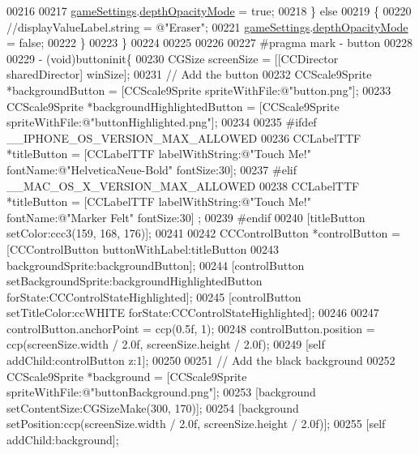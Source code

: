 \begin{DoxyCode}
{{00216         
00217         \hyperlink{interface_controls_layer_a6fb04c60ed1bfab11e2940a025b4927e}{gameSettings}.\hyperlink{interface_game_settings_a1ac5ddcb61e46f952ccd0e876a8578a4}{depthOpacityMode}  = \textcolor{keyword}{true};
00218     \} \textcolor{keywordflow}{else}
00219     \{
00220         \textcolor{comment}{//displayValueLabel.string    = @"Eraser";}
00221         \hyperlink{interface_controls_layer_a6fb04c60ed1bfab11e2940a025b4927e}{gameSettings}.\hyperlink{interface_game_settings_a1ac5ddcb61e46f952ccd0e876a8578a4}{depthOpacityMode}  = \textcolor{keyword}{false};
00222     \}
00223 \}
00224 
00225 
00226 
00227 \textcolor{preprocessor}{#pragma mark - button}
00228 \textcolor{preprocessor}{}
00229 - (void)buttoninit\{
00230     CGSize screenSize = [[CCDirector sharedDirector] winSize];
00231     \textcolor{comment}{// Add the button}
00232     CCScale9Sprite *backgroundButton = [CCScale9Sprite spriteWithFile:@"button.png"];
00233     CCScale9Sprite *backgroundHighlightedButton = [CCScale9Sprite spriteWithFile:@"buttonHighlighted.png"];
00234     
00235 \textcolor{preprocessor}{#ifdef \_\_IPHONE\_OS\_VERSION\_MAX\_ALLOWED}
00236 \textcolor{preprocessor}{}    CCLabelTTF *titleButton = [CCLabelTTF labelWithString:@"Touch Me!" fontName:@"HelveticaNeue-Bold" 
      fontSize:30];
00237 \textcolor{preprocessor}{#elif \_\_MAC\_OS\_X\_VERSION\_MAX\_ALLOWED}
00238 \textcolor{preprocessor}{}    CCLabelTTF *titleButton = [CCLabelTTF labelWithString:@"Touch Me!" fontName:@"Marker Felt" fontSize:30]
      ;
00239 \textcolor{preprocessor}{#endif}
00240 \textcolor{preprocessor}{}    [titleButton setColor:ccc3(159, 168, 176)];
00241     
00242     CCControlButton *controlButton = [CCControlButton buttonWithLabel:titleButton
00243                                                      backgroundSprite:backgroundButton];
00244     [controlButton setBackgroundSprite:backgroundHighlightedButton forState:CCControlStateHighlighted];
00245     [controlButton setTitleColor:ccWHITE forState:CCControlStateHighlighted];
00246     
00247     controlButton.anchorPoint = ccp(0.5f, 1);
00248     controlButton.position = ccp(screenSize.width / 2.0f, screenSize.height / 2.0f);
00249     [\textcolor{keyword}{self} addChild:controlButton z:1];
00250     
00251     \textcolor{comment}{// Add the black background}
00252     CCScale9Sprite *background = [CCScale9Sprite spriteWithFile:@"buttonBackground.png"];
00253     [background setContentSize:CGSizeMake(300, 170)];
00254     [background setPosition:ccp(screenSize.width / 2.0f, screenSize.height / 2.0f)];
00255     [\textcolor{keyword}{self} addChild:background];
}}
\end{DoxyCode}
